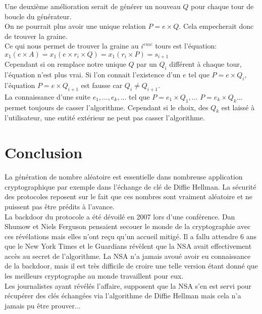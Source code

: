 \documentclass[a4paper,11pt]{report}
\begin{document}
	
	
	
	Une deuxi\`eme am\'elioration serait de g\'en\'erer un nouveau $Q$ pour chaque tour de boucle du g\'en\'erateur. \\
	On ne pourrait plus avoir une unique relation $P=e\times Q$. Cela empecherait donc de trouver %
	la graine. \\
	Ce qui nous permet de trouver la graine au $i^{eme}$ tours est l'\'equation:\\
	$x_1(e\times A)= x_1(e\times r_i\times Q)= x_1(r_i\times P)=s_{i+1}$\\
	Cependant si on remplace notre unique $Q$ par un $Q_i$ diff\'erent \`a chaque tour, l'\'equation n'est plus vrai. Si l'on connait l'existence d'un $e$ tel que $P=e\times Q_i$, l'\'equation %
	$P=e\times Q_{i+1}$ est fausse car $Q_i\neq Q_{i+1}$. \\
	La connaissance d'une suite $e_1,\ldots , e_k, \ldots$ tel que $P=e_1\times Q_1, \ldots$ %
	$ P=e_k\times Q_k \ldots$ permet toujours de casser l'algorithme. Cependant si le choix, des %
	$Q_k$ est laiss\'e \`a l'utilisateur, une entit\'e ext\'erieur ne peut pas casser l'algorithme. 	
	 \chapter{Conclusion}
	 
	La g\'en\'eration de nombre al\'eatoire est essentielle dans nombreuse application cryptographique %
	par exemple dans l'\'echange de cl\'e de Diffie Hellman. La s\'ecurit\'e des protocoles reposent sur %
	le fait que ces nombres sont vraiment al\'eatoire et ne puissent pas \^etre pr\'edits \`a l'avance. \\
	
	La backdoor du protocole a \'et\'e d\'evoil\'e en 2007 lors d'une conf\'erence. Dan Shumow et Niels Ferguson pensaient secouer le monde de la cryptographie avec ces r\'ev\'elations mais elles n'ont re\c{c}u qu'un accueil mitig\'e. Il a fallu attendre 6 ans que le New York Times et le Guardians r\'ev\`elent %
	que la NSA avait effectivement acc\`es au secret de l'algorithme. La NSA n'a jamais avou\'e %
	avoir eu connaissance de la backdoor, mais il est tr\`es difficile de croire une telle version %
	\'etant donn\'e que les meilleurs cryptographe au monde travaillent pour eux. \\
	Les journalistes ayant r\'ev\'el\'es l'affaire, supposent que la NSA s'en est servi pour %
	r\'ecup\'erer des cl\'es \'echang\'ees via l'algorithme de Diffie Hellman mais cela n'a jamais pu %
	\^etre prouver...
	
\end{document}
